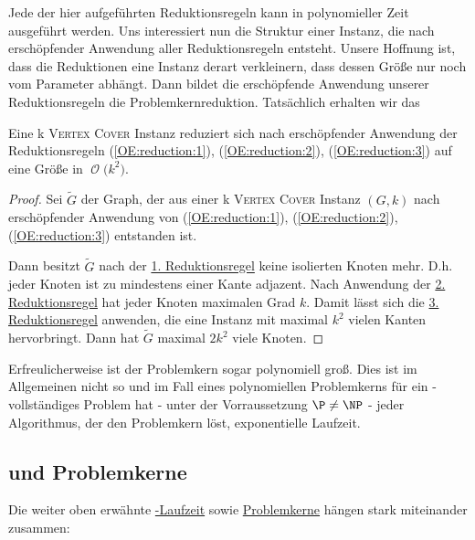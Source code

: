 \documentclass[a4paper,ngerman]{atseminar}
\newcommand{\BigO}[1]{\ensuremath{\operatorname{\mathcal{O}}\bigl(#1\bigr)}\xspace}
\begin{document}
\begin{example}
    \noindent
    Jede der hier aufgeführten Reduktionsregeln kann in polynomieller Zeit ausgeführt werden. Uns interessiert nun die Struktur einer
    Instanz, die nach erschöpfender Anwendung aller Reduktionsregeln entsteht. Unsere Hoffnung ist, dass die Reduktionen eine Instanz derart
    verkleinern, dass dessen Größe nur noch vom Parameter abhängt. Dann bildet die erschöpfende Anwendung unserer Reduktionsregeln die
    Problemkernreduktion.
    Tatsächlich erhalten wir das
    \begin{theorem}
      Eine k \textsc{Vertex Cover} Instanz reduziert sich nach erschöpfender Anwendung der Reduktionsregeln (\ref{OE:reduction:1}), (\ref{OE:reduction:2}), (\ref{OE:reduction:3}) auf
      eine Größe in \BigO{k^2}.
    \end{theorem}
    \begin{proof}
      Sei $\tilde{G}$ der Graph, der aus einer k \textsc{Vertex Cover} Instanz $(G, k)$ nach erschöpfender Anwendung von (\ref{OE:reduction:1}), (\ref{OE:reduction:2}), (\ref{OE:reduction:3}) entstanden ist.

      \noindent
      Dann besitzt $\tilde{G}$ nach der \hyperref[OE:reduction:1]{1. Reduktionsregel} keine isolierten Knoten mehr. D.h. jeder Knoten ist zu mindestens einer
      Kante adjazent.
      Nach Anwendung der \hyperref[OE:reduction:2]{2. Reduktionsregel} hat jeder Knoten maximalen Grad $k$.
      Damit lässt sich die \hyperref[OE:reduction:3]{3. Reduktionsregel} anwenden, die eine Instanz mit maximal $k^2$ vielen Kanten
      hervorbringt.
      Dann hat $\tilde{G}$ maximal $2k^2$ viele Knoten.
    \end{proof}

    \noindent
    Erfreulicherweise ist der Problemkern sogar polynomiell groß. Dies ist im Allgemeinen nicht so und im Fall eines polynomiellen
    Problemkerns für ein \NP-vollständiges Problem hat - unter der Vorraussetzung $\P \neq \NP$ - jeder Algorithmus, der den Problemkern löst, exponentielle Laufzeit.
\end{example}

\subsection{\FPT\xspace und Problemkerne}

Die weiter oben erwähnte \hyperref[OE:def:fpt]{\FPT-Laufzeit} sowie \hyperref[OE:sec:kernel]{Problemkerne} hängen stark miteinander zusammen:
\end{document}
